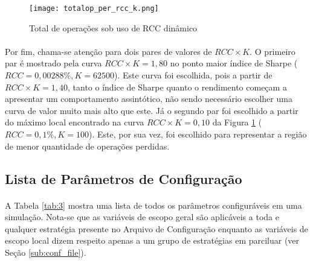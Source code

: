 \begin{figure}[!htb]
    \texttt{[image: totalop\_per\_rcc\_k.png]}
    \centering
    \caption{Total de operações sob uso de RCC dinâmico}
    \label{fig:155}
\end{figure}

\paragraph{} Por fim, chama-se atenção para dois pares de valores de \begin{math} RCC \times K \end{math}. O primeiro par é mostrado pela curva \begin{math} RCC \times K = 1,80 \end{math} no ponto maior índice de Sharpe (\begin{math} RCC = 0,00288\%, K = 62500 \end{math}). Este curva foi escolhida, pois a partir de \begin{math} RCC \times K = 1,40 \end{math}, tanto o índice de Sharpe quanto o rendimento começam a apresentar um comportamento assintótico, não sendo necessário escolher uma curva de valor muito mais alto que este. Já o segundo par foi escolhido a partir do máximo local encontrado na curva \begin{math} RCC \times K = 0,10 \end{math} da Figura \ref{fig:155} (\begin{math} RCC = 0,1\%, K = 100 \end{math}). Este, por sua vez, foi escolhido para representar a região de menor quantidade de operações perdidas.



\FloatBarrier
\subsection{Lista de Parâmetros de Configuração}
\label{sub:params_list}

\paragraph{} A Tabela \ref{tab:3} mostra uma lista de todos os parâmetros configuráveis em uma simulação. Nota-se que as variáveis de escopo geral são aplicáveis a toda e qualquer estratégia presente no Arquivo de Configuração enquanto as variáveis de escopo local dizem respeito apenas a um grupo de estratégias em parciluar (ver Seção \ref{sub:conf_file}).

